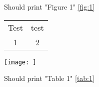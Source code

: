\documentclass{article}
\begin{document}
\begin{figure}
    \begin{floatrow}
        \ttabbox
        {\captionsetup{type=table}\caption{Should print "Figure 1" \autoref{fig:1}}
        \label{tab:1}}
        {\begin{tabular}{*{2}{c}}
        Test & test \\
        1 & 2 \\
        \end{tabular}}
        \ffigbox
        {\texttt{[image: ]}}
        {\caption{Should print "Table 1" \autoref{tab:1}}\label{fig:1}}
    \end{floatrow}
\end{figure}
\end{document}
